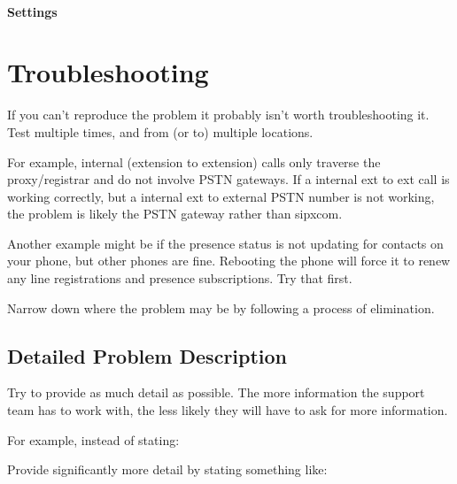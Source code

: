 \documentclass[letterpaper,10pt,english]{sphinxmanual}
\begin{document}
\subsubsection{Settings}
\label{\detokenize{webui:id62}}\begin{quote}

\end{quote}

\ignorespaces 

\chapter{Troubleshooting}
\label{\detokenize{troubleshooting:troubleshooting}}\label{\detokenize{troubleshooting:index-0}}\label{\detokenize{troubleshooting::doc}}
If you can’t reproduce the problem it probably isn’t worth troubleshooting it. Test multiple times, and from (or to) multiple locations.

For example, internal (extension to extension) calls only traverse the proxy/registrar and do not involve PSTN gateways.
If a internal ext to ext call is working correctly, but a internal ext to external PSTN number is not working, the problem is likely the PSTN gateway rather than sipxcom.

Another example might be if the presence status is not updating for contacts on your phone, but other phones are fine.
Rebooting the phone will force it to renew any line registrations and presence subscriptions. Try that first.

Narrow down where the problem may be by following a process of elimination.


\section{Detailed Problem Description}
\label{\detokenize{troubleshooting:detailed-problem-description}}
Try to provide as much detail as possible. The more information the support team has to work with, the less likely they will have to ask for more information.

For example, instead of stating:


Provide significantly more detail by stating something like:
\end{document}
